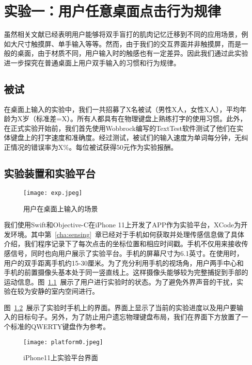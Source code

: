 \chapter{实验一：用户任意桌面点击行为规律}
虽然相关文献已经表明用户能够将双手盲打的肌肉记忆迁移到不同的应用场景，例如大尺寸触摸屏、单手输入等等。然而，由于我们的交互界面并非触摸屏，而是一般的桌面，由于材质不同，用户输入时的触感也有一定差异。因此我们通过此实验进一步探究在普通桌面上用户双手输入的习惯和行为规律。

\label{cha:exp1}
\section{被试}
在桌面上输入的实验中，我们一共招募了X名被试（男性X人，女性X人），平均年龄为X岁（标准差=X）。所有人都具有在物理键盘上熟练打字的使用习惯。此外，在正式实验开始前，我们首先使用Wobbrock编写的TextTest软件\cite{texttest}\cite{wobbrock2006analyzing}测试了他们在实体键盘上的打字速度和准确度。经过测试，被试们的输入速度为单词每分钟，无纠正情况的错误率为X\%。每位被试获得50元作为实验报酬。

\section{实验装置和实验平台}
\begin{figure}[h] %
    \centering
    \texttt{[image: exp.jpeg]}
    \caption{用户在桌面上输入的场景}
    \label{fig:exp}
\end{figure}
我们使用Swift和Objective-C在iPhone 11上开发了APP作为实验平台，XCode为开发环境。其中第~\ref{cha:sensing}~章已经对于手机如何获取并处理传感信息做了具体介绍，我们程序记录下了每次点击的坐标位置和相应时间戳。手机不仅用来接收传感信号，同时也向用户展示了实验平台。手机的屏幕尺寸为6.1英寸。在使用时，用户的双手距离手机约15-30厘米。为了充分利用手机的视场角，用户两手中心和手机的前置摄像头基本处于同一竖直线上。这样摄像头能够较为完整捕捉到手部的运动信息。图~\ref{fig:exp}~展示了用户进行实验时的状态。为了避免外界声音的干扰，实验在较为安静的室内空间进行。

图~\ref{fig:platform0}~展示了实验时手机上的界面。界面上显示了当前的实验进度以及用户要输入的目标句子。另外，为了防止用户遗忘物理键盘布局，我们在界面下方放置了一个标准的QWERTY键盘作为参考。

\begin{figure}[h] %
    \centering
    \texttt{[image: platform0.jpeg]}
    \caption{iPhone11上实验平台界面}
    \label{fig:platform0}
\end{figure}


